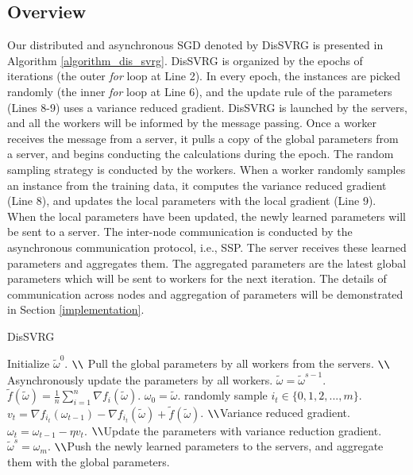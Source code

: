 \documentclass[preprint,review,11pt,a4paper]{elsarticle}
\begin{document}
\subsection{Overview}
Our distributed and asynchronous SGD denoted by DisSVRG is presented  in Algorithm \ref{algorithm_dis_svrg}. DisSVRG is organized by the epochs of iterations (the outer \emph{for} loop at Line 2). In every epoch, the instances are picked randomly (the inner \emph{for} loop at Line 6), and the update rule of the parameters (Lines 8-9) uses a variance reduced gradient. DisSVRG is launched by the servers, and all the workers will be informed by the message passing. Once a worker receives the message from a server, it pulls a copy of the global parameters from a server, and  begins conducting the calculations during the epoch. The random sampling strategy is conducted by the workers. When a worker randomly samples an instance from the training data, it computes the variance reduced gradient (Line 8), and updates the local parameters with the local gradient (Line 9). When the local parameters have been updated, the newly learned parameters will be sent to a server. The inter-node communication is conducted by the asynchronous communication protocol, i.e., SSP. The server receives these learned parameters  and aggregates them. The aggregated parameters are the latest global parameters which will be sent to workers for the next iteration. The details of communication across nodes and aggregation of parameters will be demonstrated in Section \ref{implementation}.

\begin{algorithm}[t]
    \caption{DisSVRG}
    \label{algorithm_dis_svrg}
    \begin{algorithmic}[1]
        \State Initialize $\tilde{\omega}^0$. $ \verb|\\|$ Pull the global parameters by all workers from the servers.
         $ \verb|\\|$ Asynchronously update the parameters by all workers.
            \State $\tilde{\omega}=\tilde{\omega}^{s-1}$.
            \State $\tilde{f}(\tilde{\omega})=\frac{1}{n}\sum\limits_{i=1}^n\nabla f_i(\tilde{\omega})$.
            \State $\omega_0=\tilde{\omega}$.
                \State randomly sample $i_t\in\{0,1,2,...,m\}$.
                \State $v_t=\nabla f_{i_t}(\omega_{t-1})-\nabla f_{i_t}(\tilde{\omega})+\tilde{f}(\tilde{\omega})$. $ \verb|\\|$Variance reduced gradient.
                \State $\omega_t=\omega_{t-1}-\eta v_t$. $ \verb|\\|$Update the parameters with variance reduction gradient.
           \EndFor
           \State $\tilde{\omega}^s=\omega_m$. $ \verb|\\|$Push the newly learned parameters to the servers, and aggregate them with the global parameters.
       \EndFor
    \end{algorithmic}
\end{algorithm}
\end{document}
